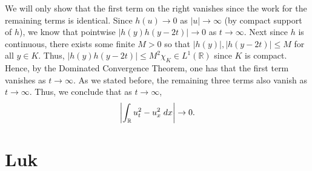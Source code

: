 \documentclass{article}
\begin{document}
\begin{enumerate}[itemsep =-2pt,label = (\alph{*})]
\begin{enumerate}[itemsep =-2pt,label = (\roman{*})]
		We will only show that the first term on the right vanishes since the work for the remaining terms is identical. Since $h(u) \to 0$ as $|u| \to \infty$ (by compact support of $h$), we know that pointwise $|h(y)h(y - 2t)| \to 0$ as $t \to \infty$. Next since $h$ is continuous, there exists some finite $M > 0$ so that $|h(y)|, |h(y - 2t)| \leq M$ for all $y \in K$. Thus, $|h(y)h(y-2t)| \leq M^2\chi_{K} \in L^1(\mathbb{R})$ since $K$ is compact. Hence, by the Dominated Convergence Theorem, one has that the first term vanishes as $t \to \infty$. As we stated before, the remaining three terms also vanish as $t \to \infty$. Thus, we conclude that as $t \to \infty$,
		\begin{equation*}
			\left| \int_{\mathbb{R}}u_t^2 - u_x^2\;dx \right| \to 0. 
		\end{equation*}
	\end{enumerate}
\end{enumerate}

\newpage 
\section{Luk} 
\end{document}
